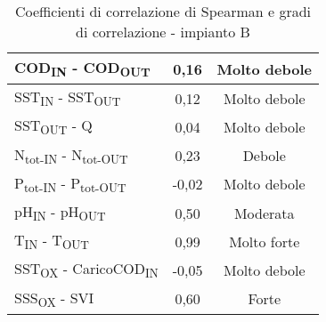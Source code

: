 \begin{table}[]
\begin{center}
\begin{tabular}{|l|c|c|}
		COD\textsubscript{IN} - COD\textsubscript{OUT}                           & 0,16       & Molto debole                                                             \\ \hline
		SST\textsubscript{IN} - SST\textsubscript{OUT}                           & 0,12       & Molto debole                                                             \\ \hline
		SST\textsubscript{OUT} - Q                               & 0,04       & Molto debole                                                             \\ \hline
		N\textsubscript{tot-IN} - N\textsubscript{tot-OUT}                       & 0,23       & Debole                                                                   \\ \hline
		P\textsubscript{tot-IN} - P\textsubscript{tot-OUT}                       & -0,02      & Molto debole                                                             \\ \hline
		pH\textsubscript{IN} - pH\textsubscript{OUT}                             & 0,50       & Moderata                                                                 \\ \hline
		T\textsubscript{IN} - T\textsubscript{OUT}                               & 0,99       & Molto forte                                                              \\ \hline
		SST\textsubscript{OX} - CaricoCOD\textsubscript{IN}                      & -0,05      & Molto debole                                                             \\ \hline
		SSS\textsubscript{OX} - SVI                              & 0,60       & Forte                                                                    \\ \hline
	\end{tabular}
	\caption{Coefficienti di correlazione di Spearman e gradi di correlazione - impianto B}
	\label{tab:c_corr}
\end{center}
\end{table}